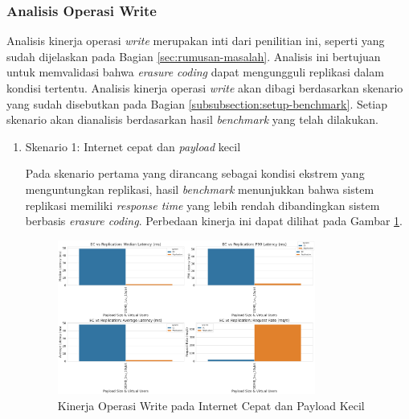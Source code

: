 \subsubsection{Analisis Operasi Write}
\label{subsubsection:analisis-operasi-write}

Analisis kinerja operasi \textit{write} merupakan inti dari penilitian ini, seperti yang sudah dijelaskan pada Bagian \ref{sec:rumusan-masalah}. Analisis ini bertujuan untuk memvalidasi bahwa \textit{erasure coding} dapat mengungguli replikasi dalam kondisi tertentu. Analisis kinerja operasi \textit{write} akan dibagi berdasarkan skenario yang sudah disebutkan pada Bagian \ref{subsubsection:setup-benchmark}. Setiap skenario akan dianalisis berdasarkan hasil \textit{benchmark} yang telah dilakukan.

\begin{enumerate}
  \item Skenario 1: Internet cepat dan \textit{payload} kecil

  Pada skenario pertama yang dirancang sebagai kondisi ekstrem yang menguntungkan replikasi, hasil \textit{benchmark} menunjukkan bahwa sistem replikasi memiliki \textit{response time} yang lebih rendah dibandingkan sistem berbasis \textit{erasure coding}. Perbedaan kinerja ini dapat dilihat pada Gambar \ref{fig:write-smload-fastnet}.

  \begin{figure}[ht]
      \centering
      \includegraphics[width=0.8\textwidth]{resources/chapter-4/write_smload_fastnet.png}

      \caption{Kinerja Operasi Write pada Internet Cepat dan Payload Kecil}
      \label{fig:write-smload-fastnet}
  \end{figure}


\end{enumerate}
